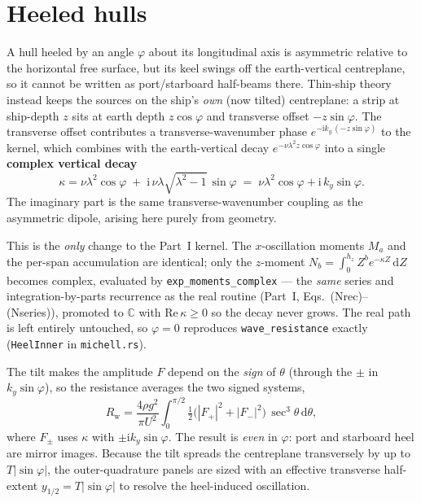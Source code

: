 \documentclass[11pt]{article}
\newcommand{\ii}{\mathrm{i}}
\newcommand{\dd}{\,\mathrm{d}}
\newcommand{\Rw}{R_{\mathrm{w}}}
\begin{document}
\section{Heeled hulls}
\label{sec:heel}

A hull heeled by an angle $\varphi$ about its longitudinal axis is asymmetric
relative to the horizontal free surface, but its keel swings off the
earth-vertical centreplane, so it cannot be written as port/starboard half-beams
there. Thin-ship theory instead keeps the sources on the ship's \emph{own}
(now tilted) centreplane: a strip at ship-depth $z$ sits at earth depth
$z\cos\varphi$ and transverse offset $-z\sin\varphi$. The transverse offset
contributes a transverse-wavenumber phase $e^{-\ii k_y\,(-z\sin\varphi)}$ to the
kernel, which combines with the earth-vertical decay $e^{-\nu\lambda^2
z\cos\varphi}$ into a single \textbf{complex vertical decay}
\begin{equation}
  \boxed{\;
  \kappa = \nu\lambda^2\cos\varphi
    \;+\; \ii\,\nu\lambda\sqrt{\lambda^2-1}\,\sin\varphi
    \;=\; \nu\lambda^2\cos\varphi + \ii\,k_y\sin\varphi. \;}
  \label{eq:heelkappa}
\end{equation}
The imaginary part is the same transverse-wavenumber coupling as the asymmetric
dipole, arising here purely from geometry.

This is the \emph{only} change to the Part~I kernel. The $x$-oscillation moments
$M_a$ and the per-span accumulation are identical; only the $z$-moment
$N_b = \int_0^{h_z} Z^b e^{-\kappa Z}\dd Z$ becomes complex, evaluated by
\texttt{exp\_moments\_complex} --- the \emph{same} series and integration-by-parts
recurrence as the real routine (Part~I, Eqs.~(Nrec)--(Nseries)), promoted to
$\mathbb{C}$ with $\mathrm{Re}\,\kappa\ge 0$ so the decay never grows. The real
path is left entirely untouched, so $\varphi = 0$ reproduces
\texttt{wave\_resistance} exactly (\texttt{HeelInner} in \texttt{michell.rs}).

The tilt makes the amplitude $F$ depend on the \emph{sign} of $\theta$ (through
the $\pm$ in $k_y\sin\varphi$), so the resistance averages the two signed
systems,
\begin{equation}
  \Rw = \frac{4\rho g^2}{\pi U^2}\int_0^{\pi/2}
    \tfrac12\bigl(|F_+|^2 + |F_-|^2\bigr)\,\sec^3\theta\dd\theta,
\end{equation}
where $F_\pm$ uses $\kappa$ with $\pm\ii k_y\sin\varphi$. The result is
\emph{even} in $\varphi$: port and starboard heel are mirror images. Because the
tilt spreads the centreplane transversely by up to $T|\sin\varphi|$, the
outer-quadrature panels are sized with an effective transverse half-extent
$y_{1/2} = T|\sin\varphi|$ to resolve the heel-induced oscillation.
\end{document}
